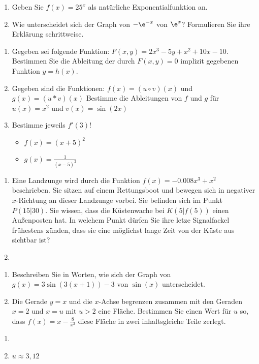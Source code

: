 \begin{enumerate}
	\item Geben Sie $f(x)=25^x$ als natürliche Exponentialfunktion an.
	\item	Wie unterscheidet sich der Graph von $-\e^{-x}$ von $\e^x$? Formulieren Sie ihre Erklärung schrittweise.
\end{enumerate}



\begin{enumerate}
	\item Gegeben sei folgende Funktion: $F(x,y)=2x^3-5y+x^2+10x-10$. Bestimmen Sie die Ableitung der durch $F(x,y)=0$ implizit gegebenen Funktion $y=h(x)$.
	\item Gegeben sind die Funktionen:
	$f(x) = (u \circ v)(x)$ und $g(x) = (u* v)(x)$
	Bestimme die Ableitungen von $f$ und $g$ für $u(x)=x^2$ und $v(x)=\sin(2x)$
	\item Bestimme jeweils $f'(3)$!
	\begin{itemize}
		\item $f(x) = (x+5)^2$
		\item $g(x) = \frac{1}{(x-5)^2}$
	\end{itemize}
\end{enumerate}

\cas
\begin{enumerate}
	\item Eine Landzunge wird durch die Funktion $f(x)=-0.008x^3+x^2$ beschrieben. Sie sitzen auf einem Rettungsboot und bewegen sich in negativer $x$-Richtung an dieser Landzunge vorbei. Sie befinden sich im Punkt $P(15|30)$. Sie wissen, dass die Küstenwache bei $K(5|f(5))$ einen Außenposten hat. In welchem Punkt dürfen Sie ihre letze Signalfackel frühestens zünden, dass sie eine möglichst lange Zeit von der Küste aus sichtbar ist?
  \item
\end{enumerate}

\begin{enumerate}
	\item Beschreiben Sie in Worten, wie sich der Graph von $g(x)=3\sin(3(x+1))-3$ von $\sin(x)$ unterscheidet.
	\item Die Gerade $y=x$ und die $x$-Achse begrenzen zusammen mit den Geraden $x=2$ und $x=u$ mit $u>2$ eine Fläche. Bestimmen Sie einen Wert für $u$ so, dass $f(x)=x-\frac{8}{x^2}$ diese Fläche in zwei inhaltsgleiche Teile zerlegt. \cas
\end{enumerate}
\begin{lsg}{}
  \begin{enumerate}
		\item
    \item $u\approx 3,12$
  \end{enumerate}
\end{lsg}


